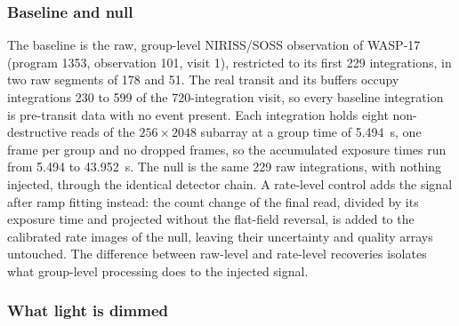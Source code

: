 \subsubsection{Baseline and null}


The baseline is the raw, group-level NIRISS/SOSS observation of WASP-17
(program 1353, observation 101, visit 1), restricted to its first 229
integrations, in two raw segments of 178 and 51. The real transit and
its buffers occupy integrations 230 to 599 of the 720-integration visit,
so every baseline integration is pre-transit data with no event present. Each
integration holds eight non-destructive reads of the $256\times2048$
subarray at a group time of 5.494~s, one frame per group and no dropped
frames, so the accumulated exposure times run from 5.494 to 43.952~s.
The null is the same 229 raw integrations, with nothing injected,
through the identical detector chain. A rate-level control adds the
signal after ramp fitting instead: the count change of the final read,
divided by its exposure time and projected without the flat-field
reversal, is added to the calibrated rate images of the null, leaving
their uncertainty and quality arrays untouched. The difference between
raw-level and rate-level recoveries isolates what group-level processing
does to the injected signal.

\subsubsection{What light is dimmed}


